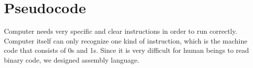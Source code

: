 \documentclass[../main.tex]{subfiles}
\begin{document}
    \section{Pseudocode}
    Computer needs very specific and clear instructions in order to run correctly.
    Computer itself can only recognize one kind of instruction, which is the
    machine code that consists of 0s and 1s. Since it is very difficult for human
    beings to read binary code, we designed assembly language. 
\end{document}
